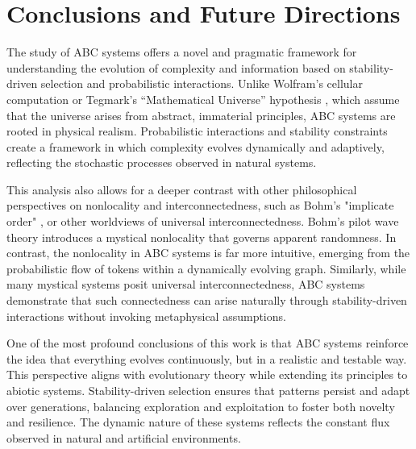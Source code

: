 \documentclass[entropy,article,submit,pdftex,oneauthor]{Definitions/mdpi}
\begin{document}
\section{Conclusions and Future Directions}

The study of ABC systems offers a novel and pragmatic framework for understanding the evolution of complexity and information based on stability-driven selection and probabilistic interactions. Unlike Wolfram’s cellular computation \cite{wolfram2020fundamental} or Tegmark’s “Mathematical Universe” hypothesis \cite{tegmark2008mathematical}, which assume that the universe arises from abstract, immaterial principles, ABC systems are rooted in physical realism. Probabilistic interactions and stability constraints create a framework in which complexity evolves dynamically and adaptively, reflecting the stochastic processes observed in natural systems.

This analysis also allows for a deeper contrast with other philosophical perspectives on nonlocality and interconnectedness, such as Bohm's "implicate order" \cite{bohm1980wholeness}, or other worldviews of universal interconnectedness. Bohm's pilot wave theory introduces a mystical nonlocality that governs apparent randomness. In contrast, the nonlocality in ABC systems is far more intuitive, emerging from the probabilistic flow of tokens within a dynamically evolving graph. Similarly, while many mystical systems posit universal interconnectedness, ABC systems demonstrate that such connectedness can arise naturally through stability-driven interactions without invoking metaphysical assumptions.

One of the most profound conclusions of this work is that ABC systems reinforce the idea that everything evolves continuously, but in a realistic and testable way. This perspective aligns with evolutionary theory while extending its principles to abiotic systems. Stability-driven selection ensures that patterns persist and adapt over generations, balancing exploration and exploitation to foster both novelty and resilience. The dynamic nature of these systems reflects the constant flux observed in natural and artificial environments.
\end{document}
